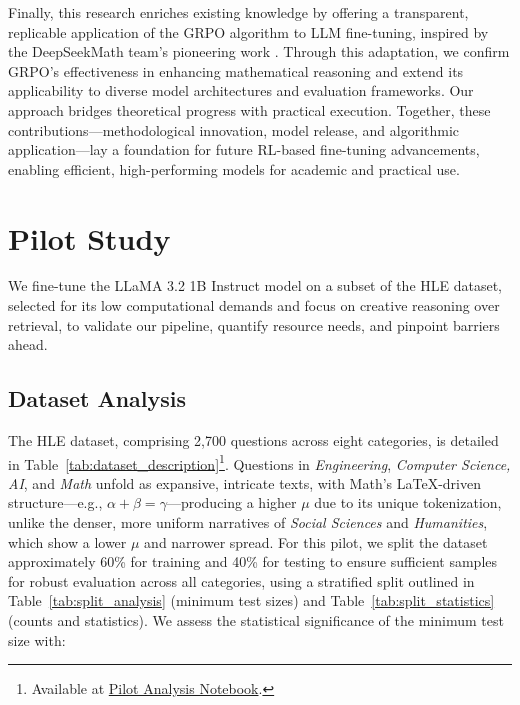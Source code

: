 \documentclass{svproc}
\begin{document}
Finally, this research enriches existing knowledge by offering a transparent, replicable application of the GRPO algorithm to LLM fine-tuning, inspired by the DeepSeekMath team’s pioneering work \cite{shao2024deepseekmathpushinglimitsmathematical}. Through this adaptation, we confirm GRPO’s effectiveness in enhancing mathematical reasoning and extend its applicability to diverse model architectures and evaluation frameworks. Our approach bridges theoretical progress with practical execution. Together, these contributions—methodological innovation, model release, and algorithmic application—lay a foundation for future RL-based fine-tuning advancements, enabling efficient, high-performing models for academic and practical use.


\section{Pilot Study}

We fine-tune the LLaMA 3.2 1B Instruct model on a subset of the HLE dataset, selected for its low computational demands and focus on creative reasoning over retrieval, to validate our pipeline, quantify resource needs, and pinpoint barriers ahead.

\subsection{Dataset Analysis}

The HLE dataset, comprising 2,700 questions across eight categories, is detailed in Table~\ref{tab:dataset_description}\footnote{Available at \href{https://github.com/pre63/quantized-optimization-of-mathematical-reasoning-study/blob/main/pilot/analysis.ipynb}{Pilot Analysis Notebook}.}. Questions in \textit{Engineering}, \textit{Computer Science, AI}, and \textit{Math} unfold as expansive, intricate texts, with Math’s LaTeX-driven structure—e.g., \(\alpha + \beta = \gamma\)—producing a higher \(\mu\) due to its unique tokenization, unlike the denser, more uniform narratives of \textit{Social Sciences} and \textit{Humanities}, which show a lower \(\mu\) and narrower spread. For this pilot, we split the dataset approximately 60\% for training and 40\% for testing to ensure sufficient samples for robust evaluation across all categories, using a stratified split outlined in Table~\ref{tab:split_analysis} (minimum test sizes) and Table~\ref{tab:split_statistics} (counts and statistics). We assess the statistical significance of the minimum test size with:
\end{document}
